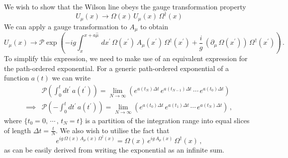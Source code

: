 We wish to show that the Wilson line obeys the gauge transformation property
%
\begin{equation}
U_\mu(x) \rightarrow \Omega(x)\,U_\mu(x)\,\Omega^\dagger(x)
\end{equation}
%
We can apply a gauge transformation to $A_\mu$ to obtain
%
\begin{equation}
U_\mu(x)\rightarrow\mathcal{P}\exp\left(-ig\int_{x}^{x+a\hat{\mu}}\,dx^\prime\, \Omega(x^\prime)\,A_\mu(x^\prime)\,\Omega^\dagger(x^\prime) + \frac{i}{g}\,(\partial_\mu\,\Omega(x^\prime))\,\Omega^\dagger(x^\prime)\right)\, .
\label{eq:WilsonLineGT(app)}
\end{equation}
%
To simplify this expression, we need to make use of an equivalent expression for the path-ordered exponential. For a generic path-ordered exponential of a function $a(t)$ we can write
%
\begin{align}
&\mathcal{P}\left(\int_0^t dt^\prime\, a(t^\prime)\right) = \lim_{N\rightarrow\infty} \left( e^{a(t_N)\Delta t}\,e^{a(t_{N-1})\Delta t}\,\cdots\,e^{a(t_0)\Delta t}\right)\nonumber\\
\implies &\mathcal{P}\left(-\int_0^t dt^\prime\, a(t^\prime)\right) = \lim_{N\rightarrow\infty} \left( e^{a(t_0)\Delta t}\,e^{a(t_{1})\Delta t}\,\cdots\,e^{a(t_N)\Delta t}\right)\, , \label{eq:OrderedExponentialLimit}
\end{align}
%
where $\lbrace t_0 = 0, \, \cdots\, , \, t_N = t\rbrace$ is a partition of the integration range into equal slices of length $\Delta t = \frac{t}{N}$. We also wish to utilise the fact that
%
\begin{equation}
e^{ig\,\Omega(x)\,A_\mu(x)\,\Omega^\dagger(x)} = \Omega(x)\,e^{ig\,A_\mu(x)}\,\Omega^\dagger(x)\, ,
\end{equation}
as can be easily derived from writing the exponential as an infinite sum.\\

